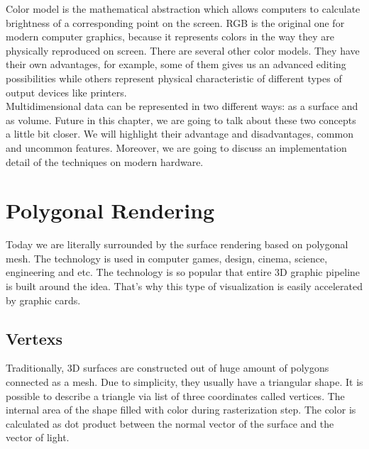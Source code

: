 \documentclass[twoside, english, 11pt]{report}
\begin{document}
Color model is the mathematical abstraction which allows computers to calculate brightness of a corresponding point on the screen. RGB is the original one for modern computer graphics, because it represents colors in the way they are physically reproduced on screen. There are several other color models. They have their own advantages, for example, some of them gives us an advanced editing possibilities while others represent physical characteristic of different types of output devices like printers.\\

Multidimensional data can be represented in two different ways: as a surface and as volume. Future in this chapter, we are going to talk about these two concepts a little bit closer. We will highlight their advantage and disadvantages, common and uncommon features. Moreover, we are going to discuss an implementation detail of the techniques on modern hardware.



\section{Polygonal Rendering}

Today we are literally surrounded by the surface rendering based on polygonal mesh. The technology is used in computer games, design, cinema, science, engineering and etc. The technology is so popular that entire 3D graphic pipeline is built around the idea. That's why this type of visualization is easily accelerated by graphic cards.\\

\subsection{Vertexs}
Traditionally, 3D surfaces are constructed out of huge amount of polygons connected as a mesh. Due to simplicity, they usually have a triangular shape. It is possible to describe a triangle via list of three coordinates called vertices. The internal area of the shape filled with color during rasterization step. The color is calculated as dot product between the normal vector of the surface and the vector of light.
\end{document}
